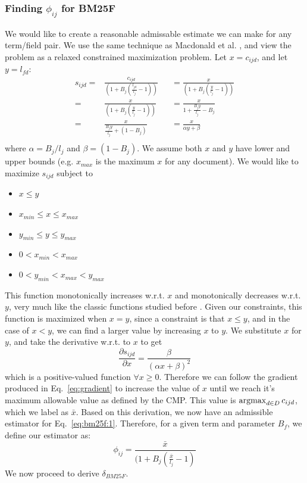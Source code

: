 \documentclass{sig-alternate}
\newcommand{\argmax}{\operatornamewithlimits{argmax}}
\begin{document}
\subsubsection{Finding $\phi_{ij}$ for BM25F}
We would like to create a reasonable admissable estimate we can make for any term/field pair. We use the same technique as Macdonald et al. \cite{Macdonald-tois-2011}, and view the problem as a relaxed constrained maximization problem. Let $x = c_{ijd}$, and let $y = l_{fd}$:
\begin{align*}
s_{ijd} =& \frac{c_{ijd}}{(1 + B_{j}(\frac{l_{jd}}{l_{j}} - 1))} &&= \frac{x}{(1+ B_{j}(\frac{y}{l_{j}} - 1))} \\
			=& \frac{x}{(1+ B_{j}(\frac{y}{l_{j}} - 1))} &&= \frac{x}{1 + \frac{B_{j}y}{l_j} - B_{j}} \\
			 =& \frac{x}{\frac{B_{j}y}{l_{j}} + (1-B_{j})} &&= \frac{x}{\alpha y + \beta} \\
\end{align*}
where $\alpha = B_{j}/l_{j}$ and $\beta = (1-B_{j})$. We assume both $x$ and $y$ have lower and upper bounds (e.g. $x_{max}$ is the maximum $x$ for any document). We would like to maximize $s_{ijd}$ subject to 
\begin{itemize}
\item $x \leq y$
\item $x_{min} \leq x \leq x_{max}$
\item $y_{min} \leq y \leq y_{max}$
\item $0 < x_{min} < x_{max}$
\item $0 < y_{min} < x_{max} < y_{max}$
\end{itemize}
This function monotonically increases w.r.t. $x$ and monotonically decreases w.r.t. $y$, very much like the classic functions studied before \cite{Macdonald-tois-2011}. Given our constraints, this function is maximized when $x = y$, since a constraint is that 
$x \leq y$, and in the case of $x < y$, we can find a larger value by increasing $x$ to $y$. We substitute $x$ for $y$, and take the derivative w.r.t. to $x$ to get
\begin{equation}
\frac{\partial s_{ijd}}{\partial x} = \frac{\beta}{(\alpha x + \beta)^{2}} \label{eq:gradient}
\end{equation}
which is a positive-valued function  $\forall x \geq 0$. Therefore we can follow the gradient produced in Eq.~\ref{eq:gradient} to increase the
value of $x$ until we reach it's maximum allowable value as defined by the CMP. This value is  $\argmax_{d \in D} c_{ijd}$, which we label as
${\bar x}$. 
Based on this derivation, we now have an admissible estimator for Eq.~\ref{eq:bm25f:1}. 
Therefore, for a given term and parameter $B_{f}$, we define our estimator as:
\begin{equation*}
\phi_{ij} = \frac{{\bar x}}{(1 + B_{j} \left(\frac{{\bar x}}{l_{j}} - 1 \right)}
\end{equation*}
We now proceed to derive $\delta_{BM25F}$.
\end{document}
